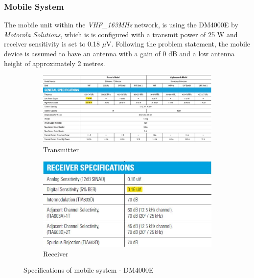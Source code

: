 \subsubsection{Mobile System}
The mobile unit within the \textit{VHF\_163MHz} network, is using the DM4000E by \textit{Motorola Solutions}, which is is configured with a transmit power of 25 W and receiver sensitivity is set to 0.18 $\mu$V.
Following the problem statement, the mobile device is assumed to have an antenna with a gain of 0 dB and a low antenna height of approximately 2 metres.

\begin{figure}[H]
\centering
     \begin{subfigure}[b]{0.45\textwidth}
         \centering
         \includegraphics[width=\textwidth]{Images/DM4000E TX.jpg}
         \caption{\small Transmitter}
         \label{fig:DM4KETx}
     \end{subfigure}
     \hspace{1cm}
     \begin{subfigure}[b]{0.45\textwidth}
         \centering
         \includegraphics[width=\textwidth]{Images/DM4000E RX.jpg}
         \caption{\small Receiver}
         \label{fig:DM4KERx}
     \end{subfigure}
     \caption{Specifications of mobile system - DM4000E}
        \label{fig:DM4000E}
\end{figure}